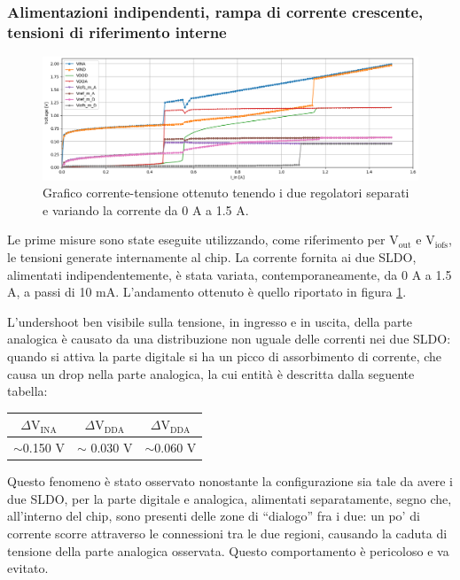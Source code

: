 \subsubsection{Alimentazioni indipendenti, rampa di corrente crescente, tensioni di riferimento interne}

\begin{figure}
\centering
\includegraphics[width=\textwidth]{Immagini/IUI2}
\caption{Grafico corrente-tensione ottenuto tenendo i due regolatori separati e variando la corrente da 0 A a 1.5 A.}%
\label{IUI}
\end{figure}
Le prime misure sono state eseguite utilizzando, come riferimento per $\mathrm{V_{out}}$ e $\mathrm{V_{iofs}}$, le tensioni generate internamente al chip.
La corrente fornita ai due SLDO, alimentati indipendentemente, è stata variata, contemporaneamente, da 0 A a 1.5 A, a passi di 10 mA.
L'andamento ottenuto è quello riportato in figura \ref{IUI}.

L'undershoot ben visibile sulla tensione, in ingresso e in uscita, della parte analogica è causato da una distribuzione non uguale delle correnti nei due SLDO: quando si attiva la parte digitale si ha un picco di assorbimento di corrente, che causa un drop nella parte analogica, la cui entità è descritta dalla seguente tabella:
\begin{center}
\begin{tabular}{ccc }
\hline
$\Delta \mathrm{V_{INA}}$ & $\Delta \mathrm{V_{DDA}}$ &$\Delta \mathrm{V_{DDA}}$  \\ \hline
$\sim$0.150 V & $\sim$ 0.030 V& $\sim$0.060 V\\ \hline     
\end{tabular}
\end{center}
Questo fenomeno è stato osservato nonostante la configurazione sia tale da avere i due SLDO, per la parte digitale e analogica, alimentati separatamente, segno che, all'interno del chip, sono presenti delle zone di ``dialogo'' fra i due: un po' di corrente scorre attraverso le connessioni tra le due regioni, causando la caduta di tensione della parte analogica osservata.
Questo comportamento è pericoloso e va evitato.

